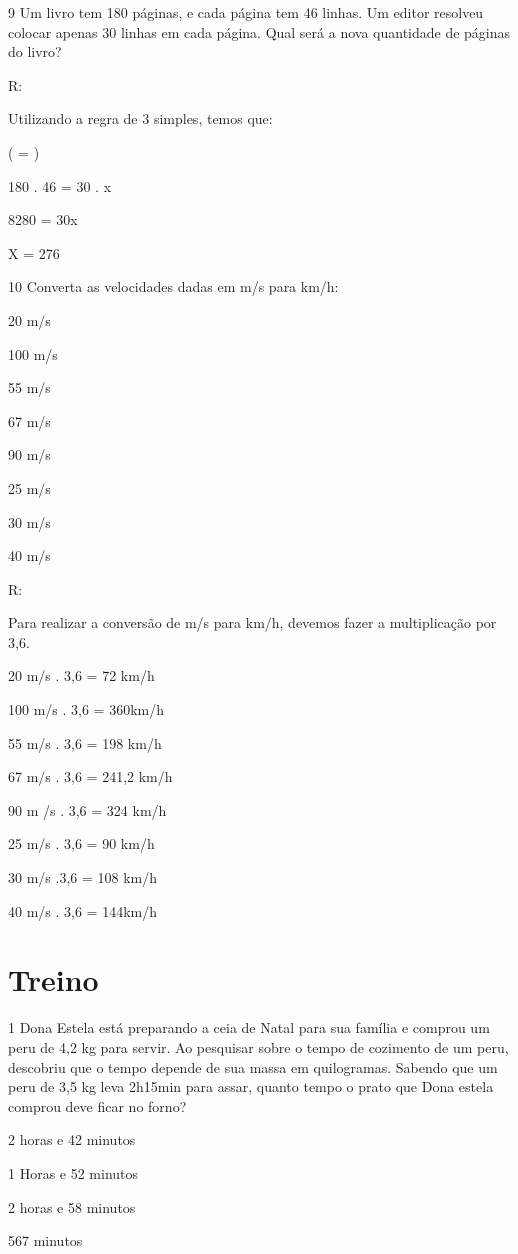{\num{9} Um livro tem 180 páginas, e cada página tem 46 linhas. Um editor
resolveu colocar apenas 30 linhas em cada página. Qual será a nova
quantidade de páginas do livro?

R:

Utilizando a regra de 3 simples, temos que:

( = )

180 . 46 = 30 . x

8280 = 30x

X = 276

\num{10} Converta as velocidades dadas em m/s para km/h:
\item 20 m/s
\item 100 m/s
\item 55 m/s
\item 67 m/s
\item 90 m/s
\item 25 m/s
\item 30 m/s
\item 40 m/s

R:

Para realizar a conversão de m/s para km/h, devemos fazer a
multiplicação por 3,6.
\item 20 m/s . 3,6 = 72 km/h
\item 100 m/s . 3,6 = 360km/h
\item 55 m/s . 3,6 = 198 km/h
\item 67 m/s . 3,6 = 241,2 km/h
\item 90 m /s . 3,6 = 324 km/h
\item 25 m/s . 3,6 = 90 km/h
\item 30 m/s .3,6 = 108 km/h
\item 40 m/s . 3,6 = 144km/h

\section{Treino}

\num{1} Dona Estela está preparando a ceia de Natal para sua família e
comprou um peru de 4,2 kg para servir. Ao pesquisar sobre o tempo de
cozimento de um peru, descobriu que o tempo depende de sua massa em
quilogramas. Sabendo que um peru de 3,5 kg leva 2h15min para assar,
quanto tempo o prato que Dona estela comprou deve ficar no forno?
\item 2 horas e 42 minutos
\item 1 Horas e 52 minutos
\item 2 horas e 58 minutos
\item 567 minutos

}
